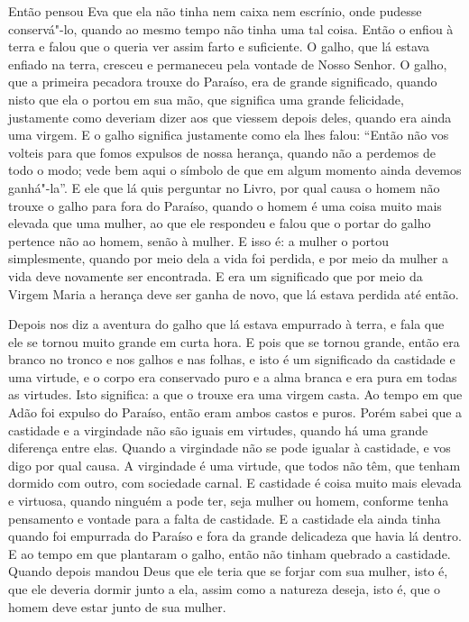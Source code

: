 Então pensou Eva que ela não tinha nem caixa nem escrínio, onde pudesse
conservá"-lo, quando ao mesmo tempo não tinha uma tal coisa. Então o enfiou à
terra e falou que o queria ver assim farto e suficiente. O galho, que lá estava
enfiado na terra, cresceu e permaneceu pela vontade de Nosso Senhor. O galho,
que a primeira pecadora trouxe do Paraíso, era de grande significado, quando
nisto que ela o portou em sua mão, que significa uma grande felicidade,
justamente como deveriam dizer aos que viessem depois deles, quando era ainda
uma virgem. E o galho significa justamente como ela lhes falou: “Então não vos
volteis para que fomos expulsos de nossa herança, quando não a perdemos de todo
o modo; vede bem aqui o símbolo de que em algum momento ainda devemos
ganhá"-la”. E ele que lá quis perguntar no Livro, por qual causa o homem não
trouxe o galho para fora do Paraíso, quando o homem é uma coisa muito mais
elevada que uma mulher, ao que ele respondeu e falou que o portar do galho
pertence não ao homem, senão à mulher. E isso é: a mulher o portou
simplesmente, quando por meio dela a vida foi perdida, e por meio da mulher a
vida deve novamente ser encontrada. E era um significado que por meio da Virgem
Maria a herança deve ser ganha de novo, que lá estava perdida até então.

Depois nos diz a aventura do galho que lá estava empurrado à terra, e fala que
ele se tornou muito grande em curta hora. E pois que se tornou grande, então era
branco no tronco e nos galhos e nas folhas, e isto é um significado da castidade
e uma virtude, e o corpo era conservado puro e a alma branca e era pura em
todas as virtudes. Isto significa: a que o trouxe era uma virgem casta. Ao
tempo em que Adão foi expulso do Paraíso, então eram ambos castos e puros.
Porém sabei que a castidade e a virgindade não são iguais em virtudes, quando
há uma grande diferença entre elas. Quando a virgindade não se pode igualar à
castidade, e vos digo por qual causa. A virgindade é uma virtude, que todos não
têm, que tenham dormido com outro, com sociedade carnal. E castidade é coisa
muito mais elevada e virtuosa, quando ninguém a pode ter, seja mulher ou homem,
conforme tenha pensamento e vontade para a falta de castidade. E a castidade
ela ainda tinha quando foi empurrada do Paraíso e fora da grande delicadeza que
havia lá dentro. E ao tempo em que plantaram o galho, então não tinham quebrado
a castidade. Quando depois mandou Deus que ele teria que se forjar com sua
mulher, isto é, que ele deveria dormir junto a ela, assim como a natureza
deseja, isto é, que o homem deve estar junto de sua mulher.

